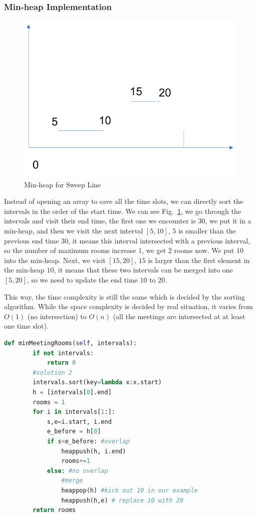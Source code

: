 \documentclass[../../main.tex]{subfiles}
\begin{document}
\subsubsection{Min-heap Implementation}
\begin{figure}[h]
    \centering
    \includegraphics[width=0.6\columnwidth]{fig/sweep_line_min_heap.png}
    \caption{Min-heap for Sweep Line}
    \label{fig:min_heap_sl}
\end{figure}
Instead of opening an array to save all the time slots, we can directly sort the intervals in the order of the start time. We can see Fig.~\ref{fig:min_heap_sl}, we go through the intervals and visit their end time, the first one we encounter is $30$, we put it in a min-heap, and then we visit the next interval $[5, 10]$, $5$ is smaller than the previous end time $30$, it means this interval intersected with a previous interval, so the number of maximum rooms increase $1$, we get $2$ rooms now. We put $10$ into the min-heap. Next, we visit $[15, 20]$, $15$ is larger than the first element in the min-heap $10$, it means that these two intervals can be merged into one $[5, 20]$, so we need to update the end time $10$ to $20$. 

This way, the time complexity is still the same which is decided by the sorting algorithm. While the space complexity is decided by real situation, it varies from $O(1)$ (no intersection) to $O(n)$ (all the meetings are intersected at at least one time slot).  
\begin{lstlisting}[language=Python]
def minMeetingRooms(self, intervals):
        if not intervals:
            return 0
        #solution 2
        intervals.sort(key=lambda x:x.start)
        h = [intervals[0].end]
        rooms = 1
        for i in intervals[1:]:
            s,e=i.start, i.end
            e_before = h[0]
            if s<e_before: #overlap
                heappush(h, i.end)
                rooms+=1
            else: #no overlap
                #merge
                heappop(h) #kick out 10 in our example
                heappush(h,e) # replace 10 with 20
        return rooms
\end{lstlisting}
\end{document}
